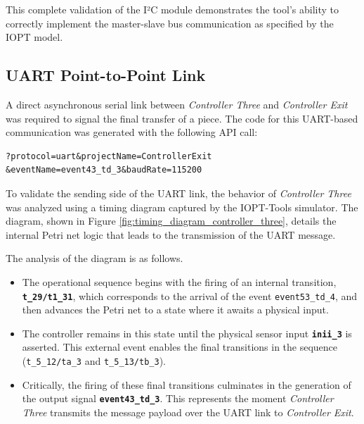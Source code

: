 This complete validation of the I²C module demonstrates the tool's ability to correctly implement the master-slave bus communication as specified by the IOPT model.



\subsection{UART Point-to-Point Link}
\label{subsec:uart_implementation}

A direct asynchronous serial link between \textit{Controller Three} and \textit{Controller Exit} was required to signal the final transfer of a piece. The code for this UART-based communication was generated with the following API call:

\begin{verbatim}
?protocol=uart&projectName=ControllerExit
&eventName=event43_td_3&baudRate=115200
\end{verbatim}

To validate the sending side of the UART link, the behavior of \textit{Controller Three} was analyzed using a timing diagram captured by the IOPT-Tools simulator. The diagram, shown in Figure \ref{fig:timing_diagram_controller_three}, details the internal Petri net logic that leads to the transmission of the UART message.

The analysis of the diagram is as follows.
\begin{itemize}
    \item The operational sequence begins with the firing of an internal transition, \textbf{\texttt{t\_29/t1\_31}}, which corresponds to the arrival of the event \texttt{event53\_td\_4}, and then advances the Petri net to a state where it awaits a physical input.
    
    \item The controller remains in this state until the physical sensor input \textbf{\texttt{inii\_3}} is asserted. This external event enables the final transitions in the sequence (\texttt{t\_5\_12/ta\_3} and \texttt{t\_5\_13/tb\_3}).
    
    \item Critically, the firing of these final transitions culminates in the generation of the output signal \textbf{\texttt{event43\_td\_3}}. This represents the moment \textit{Controller Three} transmits the message payload over the UART link to \textit{Controller Exit}.
\end{itemize}

